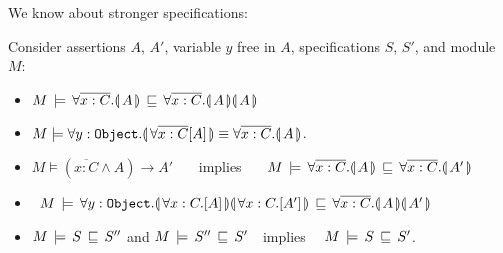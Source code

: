 We know about stronger specifications:

\begin{lemma}
Consider assertions $A$, $A'$, variable $y$ free in $A$, specifications $S$, $S'$, and module $M$:
\begin{itemize} [topsep=6pt,itemsep=5pt,parsep=0pt,partopsep=0pt]
\item
$M\, \models\, \forall {\overline {x:C}}.{\llparenthesis}\, A \,{\rrparenthesis}\, \sqsubseteq\, \forall {\overline {x:C}}.{\llparenthesis}\, A \,{\rrparenthesis}{\llparenthesis}\, A \,{\rrparenthesis} $ 
    \item
 $M \models \forall {y:{\texttt{Object}}}.{\llparenthesis}\, \forall \overline {x:C}[ A ]  \,{\rrparenthesis}   \equiv  \forall {\overline {x:C}}.{\llparenthesis}\, A \,{\rrparenthesis} $.
\item
$  M  \models (  \overline {x:C} \wedge A) \rightarrow A'$ \ \ \  implies \ \  \ $M\, \models\, \forall {\overline {x:C}}.{\llparenthesis}\, A \,{\rrparenthesis}\, \sqsubseteq\, \forall {\overline {x:C}}.{\llparenthesis}\, A' \,{\rrparenthesis}$
\item
  \ $M\, \models\,  \forall {y:{\texttt{Object}}}.{\llparenthesis}\, \forall x:C.[A] \,{\rrparenthesis}{\llparenthesis}\, \forall x:C.[A'] \,{\rrparenthesis} \, \sqsubseteq\, \forall {\overline {x:C}}.{\llparenthesis}\, A \,{\rrparenthesis}{\llparenthesis}\, A' \,{\rrparenthesis} $

\item
$M\, \models\, S\, \sqsubseteq\, S''$ and $M\, \models\, S''\, \sqsubseteq\, S'$\ \  implies \ \ $M\, \models\, S\, \sqsubseteq\, S'$.
\end{itemize}

\end{lemma}




